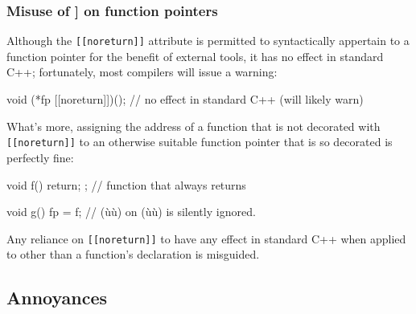 \subsubsection[Misuse of {\tt[[noreturn]]} on function pointers]{Misuse of {\SubsubsecCode [[noreturn]]} on function pointers}\label{misuse-of-[[noreturn]]-on-function-pointers}

Although the \lstinline![[noreturn]]! attribute is permitted to syntactically appertain
to a function pointer for the benefit of external tools,
it has no effect in standard C++; fortunately, most compilers will issue a warning:

\begin{emcppslisting}[emcppsbatch=e6]
void (*fp [[noreturn]])();  // no effect in standard C++ (will likely warn)
\end{emcppslisting}

\noindent What's more, assigning the address of a function
that is not decorated with \lstinline![[noreturn]]! to an otherwise
suitable function pointer that is so decorated is perfectly fine:

\begin{emcppslisting}[emcppsbatch=e6]
void f() { return; };  // function that always returns

void g()
{
    fp = f;  // (ù{\codeincomments{[[noreturn]]}}ù) on (ù{}ù) is silently ignored.
}
\end{emcppslisting}

\noindent Any reliance on \lstinline![[noreturn]]! to have any effect in standard C++
when applied to other than a function's declaration is misguided.

\subsection[Annoyances]{Annoyances}\label{annoyances}

\hspace*{\fill}


